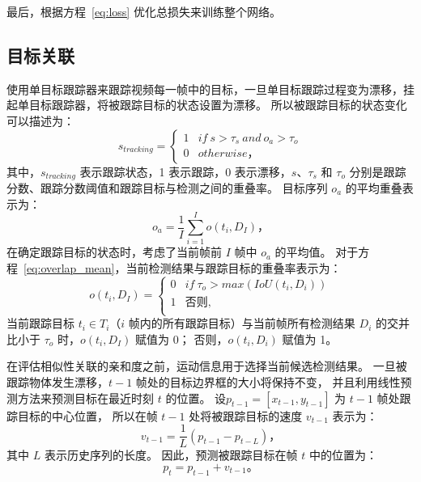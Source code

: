 最后，根据方程~\ref{eq:loss} 优化总损失来训练整个网络。


\subsection{目标关联}
\label{sec:i2vtesting}
使用单目标跟踪器来跟踪视频每一帧中的目标，一旦单目标跟踪过程变为漂移，挂起单目标跟踪器，将被跟踪目标的状态设置为漂移。
所以被跟踪目标的状态变化可以描述为：
\begin{equation}
s_{tracking} =\left\{
\begin{array}{rcl}
1 & {if \ s > \tau_s \ and \ o_{a} > \tau_o}\\
0 & {otherwise} \mbox{，}
\end{array} \right.
\end{equation}
其中，$ s_{tracking} $ 表示跟踪状态，1 表示跟踪，0 表示漂移，$s$、$\tau_s$ 和 $\tau_o$ 分别是跟踪分数、跟踪分数阈值和跟踪目标与检测之间的重叠率。
目标序列 $o_{a}$ 的平均重叠表示为：
\begin{equation}\label{eq:overlap_mean}
o_{a}=\frac{1}{I} \sum_{i=1}^{I} o\left(t_i,D_I\right) \mbox{，}
\end{equation}
在确定跟踪目标的状态时，考虑了当前帧前 $I$ 帧中 $o_a$ 的平均值。
对于方程~\ref{eq:overlap_mean}，当前检测结果与跟踪目标的重叠率表示为：
\begin{equation}
\label{overlap_target_detection}
o \left(t_i,D_I\right) =\left\{
\begin{array}{rcl}
0& {if \ \tau_o > max \left(IoU \left(t_i,D_i\right) \right) } \\
1& {\mbox{否则}}, \\
\end{array} \right.
\end{equation}
当前跟踪目标 $t_i\in T_i$（$i$ 帧内的所有跟踪目标）与当前帧所有检测结果 $D_i$ 的交并比小于 $\tau_o$ 时，$o\left(t_i,D_I\right)$ 赋值为 0；
否则，$o \left(t_i,D_i\right) $ 赋值为 1。

在评估相似性关联的亲和度之前，运动信息用于选择当前候选检测结果。
一旦被跟踪物体发生漂移，$t-1$ 帧处的目标边界框的大小将保持不变，
并且利用线性预测方法来预测目标在最近时刻 $t$ 的位置。
设$ p_{t-1}=\left[x_{t-1},y_{t-1}\right] $ 为 $ t-1 $ 帧处跟踪目标的中心位置，
所以在帧 $ t-1 $ 处将被跟踪目标的速度 $ v_{t-1} $ 表示为：
\begin{equation}
v_{t-1}=\frac{1}{L} \left( {p_{t-1}-p_{t-L}} \right) \mbox{，}
\end{equation}
其中 $L$ 表示历史序列的长度。
因此，预测被跟踪目标在帧 $t$ 中的位置为：
\begin{equation}
p_t=p_{t-1}+v_{t-1} \mbox{。}
\end{equation}

